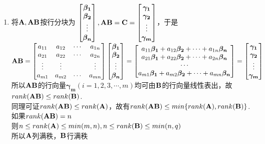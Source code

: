 \documentclass[english,onecolumn,UTF8]{IEEEtran}
\begin{document}
\begin{enumerate}
\begin{enumerate}
\item 将$\bold A,\bold A \bold B$按行分块为
$\begin{bmatrix}\boldsymbol{\beta_1}\\ \boldsymbol{\beta_2} \\ \vdots \\ \boldsymbol{\beta_n} 
\end{bmatrix},
\bold A \bold B=\bold C=
\begin{bmatrix}\boldsymbol{\gamma_1}\\ \boldsymbol{\gamma_2} \\ \vdots \\ \boldsymbol{\gamma_m} 
\end{bmatrix}$，于是
\\$\bold A \bold B=\begin{bmatrix}
a_{11} & a_{12}  & \cdots & a_{1n}      \\
a_{21} & a_{22}  & \cdots & a_{2n}      \\
\vdots & \vdots & \   & \vdots    \\
a_{m1} & a_{m2}  & \cdots & a_{mn}
\end{bmatrix}
\begin{bmatrix}\boldsymbol{\beta_1}\\ \boldsymbol{\beta_2} \\ \vdots \\ \boldsymbol{\beta_n} 
\end{bmatrix} =
\begin{bmatrix} a_{11}\boldsymbol{\beta_1} + a_{12}\boldsymbol{\beta_2}  + \cdots + a_{1n}\boldsymbol{\beta_n}
\\ a_{21}\boldsymbol{\beta_1} + a_{22}\boldsymbol{\beta_2}  + \cdots + a_{2n}\boldsymbol{\beta_n}
\\ \cdots
\\ a_{m1}\boldsymbol{\beta_1} + a_{m2}\boldsymbol{\beta_2}  + \cdots + a_{mn}\boldsymbol{\beta_n}
\end{bmatrix} 
=\begin{bmatrix}\boldsymbol{\gamma_1}\\ \boldsymbol{\gamma_2} \\ \vdots \\ \boldsymbol{\gamma_m} 
\end{bmatrix}$
\\所以$\bold A \bold B$的行向量$\boldsymbol{\gamma_m}(i=1,2,3,\cdots,m)$均可由$\bold B$的行向量线性表出，故
\\$rank(\bold A \bold B)\leq rank(\bold B)$.
\\同理可证$rank(\bold A \bold B)\leq rank(\bold A)$，故有$rank(\bold A \bold B)\leq min\{ rank(\bold A),rank(\bold B) \}$.
\\如果$rank(\bold A \bold B )=n$
\\则$ n\leq rank(\bold A )\leq min(m,n),n\leq rank(\bold B )\leq min(n,q)$
\\所以$\bold A$列满秩，$\bold B$行满秩



\end{enumerate}
\end{enumerate}
\end{document}
